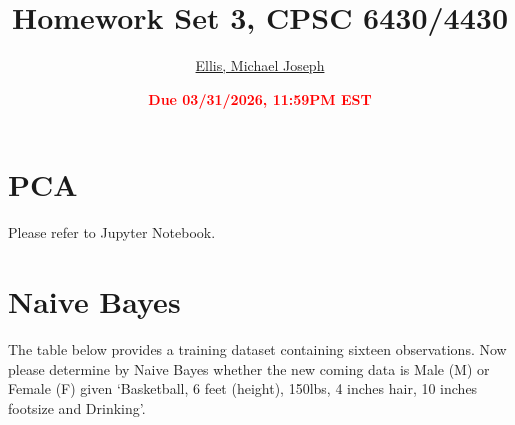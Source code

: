 \documentclass[11pt]{article}
\title{{\bf Homework Set 3, CPSC 6430/4430}}
\author{\Large\underline{Ellis, Michael Joseph}}
\date{\textbf{\Large\textcolor{red}{Due 03/31/2026, 11:59PM EST}}}
\newcommand{\R}{\mathbb{R}}
\newcommand{\minimize}{\operatorname*{minimize\ }}
\newcommand{\mtx}[1]{\mathbf{#1}}
\newcommand{\vct}[1]{\mathbf{#1}}
\def \mA {\mtx{A}}
\def \mI {\mtx{I}}
\def \mU {\mtx{U}}
\def \mX {\mtx{X}}
\def \mZ {\mtx{Z}}
\def \vv {\vct{v}}
\def \vx {\vct{x}}
\def \vy {\vct{y}}
\def \R {\mathbb{R}}
\begin{document}
\maketitle

\section*{PCA}
Please refer to Jupyter Notebook.
\newpage
\section*{Naive Bayes}
The table below provides a training dataset containing sixteen observations. Now please determine by Naive Bayes whether the new coming data is Male (M) or Female (F) given `Basketball, 6 feet (height), 150lbs, 4 inches hair, 10 inches footsize and Drinking'. 
\end{document}
